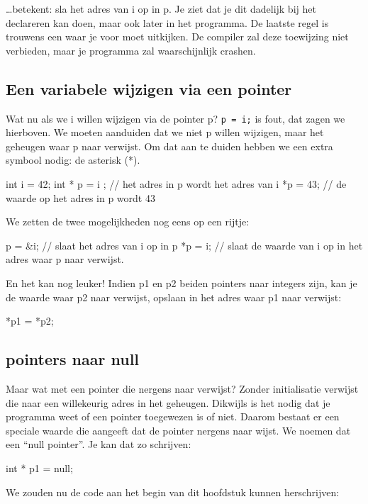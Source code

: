 \ldots betekent: sla het adres van i op in p. Je ziet dat je dit dadelijk bij het declareren kan doen, maar ook later in het programma. De laatste regel is trouwens een waar je voor moet uitkijken. De compiler zal deze toewijzing niet verbieden, maar je programma zal waarschijnlijk crashen.

\subsection{Een variabele wijzigen via een pointer}
Wat nu als we i willen wijzigen via de pointer p? \texttt{p = i;} is fout, dat zagen we hierboven. We moeten aanduiden dat we niet p willen wijzigen, maar het geheugen waar p naar verwijst. Om dat aan te duiden hebben we een extra symbool nodig: de asterisk (*).

\begin{code}
int   i = 42;
int * p = i ; // het adres in p wordt het adres van i
*p      = 43; // de waarde op het adres in p wordt 43
\end{code}

We zetten de twee mogelijkheden nog eens op een rijtje:

\begin{code}
p = &i; // slaat het adres van i op in p
*p = i; // slaat de waarde van i op in het adres waar p naar verwijst.
\end{code}

En het kan nog leuker! Indien p1 en p2 beiden pointers naar integers zijn, kan je de waarde waar p2 naar verwijst, opslaan in het adres waar p1 naar verwijst:

\begin{code}
*p1 = *p2;
\end{code}

\subsection{pointers naar null}
Maar wat met een pointer die nergens naar verwijst? Zonder initialisatie verwijst die naar een willekeurig adres in het geheugen. Dikwijls is het nodig dat je programma weet of een pointer toegewezen is of niet. Daarom bestaat er een speciale waarde die aangeeft dat de pointer nergens naar wijst. We noemen dat een ``null pointer''. Je kan dat zo schrijven:

\begin{code}
int * p1 = null;
\end{code}

We zouden nu de code aan het begin van dit hoofdstuk kunnen herschrijven:

